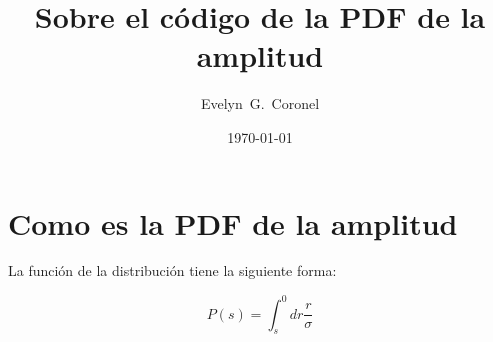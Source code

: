



\title{Sobre el código de la PDF de la amplitud}
\author{Evelyn~G.~Coronel}


\date[]{\lowercase{\today}} %


\maketitle


\section*{Como  es la PDF de la amplitud}

La función de la distribución tiene la siguiente forma:

\begin{equation}
    P(s) = \int_{s}^{0} dr \frac{r}{\sigma}
\end{equation}



